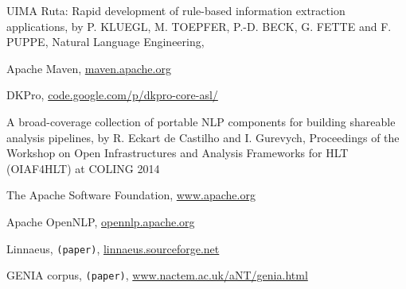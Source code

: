 \documentclass{article}
\newcommand{\TODO}[1]{\texttt{\textcolor{YellowOrange}{(#1)}}} %
\begin{document}
\begin{thebibliography}{99}
    UIMA Ruta: Rapid development of rule-based information extraction applications,
    by P. KLUEGL, M. TOEPFER, P.-D. BECK, G. FETTE and F. PUPPE,
    Natural Language Engineering,

    Apache Maven,
    \href{https://maven.apache.org/}{maven.apache.org}

    DKPro,
    \href{https://code.google.com/p/dkpro-core-asl/}{code.google.com/p/dkpro-core-asl/}

    A broad-coverage collection of portable NLP components for building shareable analysis
    pipelines,
    by R. Eckart de Castilho and I. Gurevych,
    Proceedings of the Workshop on Open Infrastructures and Analysis Frameworks for HLT (OIAF4HLT)
    at COLING 2014

    The Apache Software Foundation,
    \href{http://www.apache.org/}{www.apache.org}

    Apache OpenNLP,
    \href{https://opennlp.apache.org/}{opennlp.apache.org}

    Linnaeus,
	\TODO{paper},
    \href{http://linnaeus.sourceforge.net/}{linnaeus.sourceforge.net}

    GENIA corpus,
	\TODO{paper},
    \href{http://www.nactem.ac.uk/aNT/genia.html}{www.nactem.ac.uk/aNT/genia.html}


\end{thebibliography}

\end{document}
